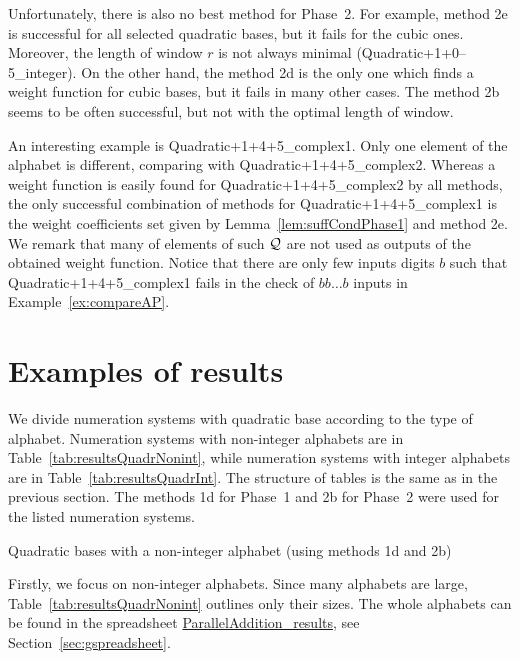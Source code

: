 Unfortunately, there is also no best method for Phase~2. For example, method 2e is successful for all selected quadratic bases, but it fails for the cubic ones. Moreover, the length of window $r$ is not always minimal (Quadratic+1+0--5\_integer). On the other hand, the method 2d is the only one which finds a weight function for cubic bases, but it fails in many other cases. The method 2b seems to be often successful, but not with the optimal length of window.

An interesting example is Quadratic+1+4+5\_complex1. Only one element of the alphabet is different, comparing with Quadratic+1+4+5\_complex2. Whereas a weight function is easily found for Quadratic+1+4+5\_complex2 by all methods, the only successful combination of methods for Quadratic+1+4+5\_complex1 is the weight coefficients set given by Lemma~\ref{lem:suffCondPhase1} and method 2e. We remark that many of elements of such $\mathcal{Q}$ are not used as outputs of the obtained weight function. Notice   that there are only few inputs digits $b$ such that  Quadratic+1+4+5\_complex1 fails in the check of $bb\dots b$ inputs in Example~\ref{ex:compareAP}.





\section{Examples of results}
\label{sec:resultsExamples}
We divide numeration systems with quadratic base according to the type of  alphabet. Numeration systems with non-integer alphabets are in Table~\ref{tab:resultsQuadrNonint}, while numeration systems with integer alphabets are in Table~\ref{tab:resultsQuadrInt}. The structure of tables is the same as in the previous section. The methods 1d for Phase~1 and 2b for Phase~2 were used for the listed numeration systems.

\begin{table}[tpb]
	\begin{center}
	
	\end{center}
\caption{Quadratic bases with a non-integer alphabet (using methods 1d and 2b)}
\label{tab:resultsQuadrNonint}
\end{table}

Firstly, we focus on non-integer alphabets. Since many alphabets are large, Table~\ref{tab:resultsQuadrNonint} outlines only their sizes. The whole alphabets can be found in the spreadsheet \href{https://docs.google.com/spreadsheets/d/1TnhrHdefHfHa0WSeVs4q6XVj3epjPlPlnoekE0E1xeM/edit?usp=sharing}{ParallelAddition\_results}, see Section~\ref{sec:gspreadsheet}.

